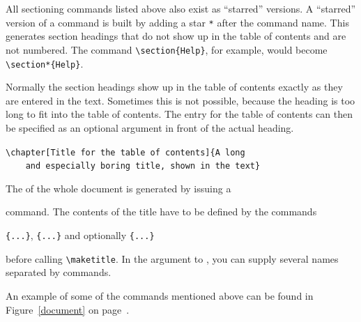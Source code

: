All sectioning commands listed above also exist as ``starred''
versions.  A ``starred'' version of a command is built by adding a
star \verb|*| after the command name.  This generates section headings
that do not show up in the table of contents and are not
numbered. The command \verb|\section{Help}|, for example, would become
\verb|\section*{Help}|.

Normally the section headings show up in the table of contents exactly
as they are entered in the text. Sometimes this is not possible,
because the heading is too long to fit into the table of contents. The
entry for the table of contents can then be specified as an
optional argument in front of the actual heading.

\begin{code}
\verb|\chapter[Title for the table of contents]{A long|\\
\verb|    and especially boring title, shown in the text}|
\end{code} 

The  of the whole document is generated by issuing a 
\begin{lscommand}
\end{lscommand}
\noindent command. The contents of the title have to be defined by the commands
\begin{lscommand}
\verb|{...}|, \verb|{...}| 
and optionally \verb|{...}| 
\end{lscommand}
\noindent before calling \verb|\maketitle|. In the argument to , you can
supply several names separated by  commands. 

An example of some of the commands mentioned above can be found in
Figure~\ref{document} on page~\pageref{document}.

